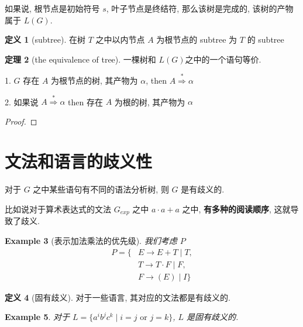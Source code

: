 \documentclass[12pt]{ctexart}
\theoremstyle{definition}
\theoremstyle{definition}
\newtheorem{definition}{定义}[section]
\newtheorem{thm}[definition]{定理}
\theoremstyle{plain}
\newtheorem{exam}[definition]{Example}
\theoremstyle{remark}
\begin{document}
如果说, 根节点是初始符号 \(s\), 叶子节点是终结符, 那么该树是完成的, 该树的产物属于 \(L (G) \). 
\begin{definition}[subtree]\label{def:subtree}
在树 \(T\) 之中以内节点 \(A\) 为根节点的 subtree 为 \(T\) 的 subtree
\end{definition}

\begin{thm}[the equivalence of tree]
	一棵树和 \(L (G)\)之中的一个语句等价. 

	1. \(G\) 存在 \(A\) 为根节点的树, 其产物为 \(\alpha\), then \(A \overset{*}{\Rightarrow}\alpha\)

	2. 如果说 \(A \overset{*}{\Rightarrow}\alpha\) then 存在 \(A\) 为根的树, 其产物为 \(\alpha\)
\end{thm}
\begin{proof}
\end{proof}


\section{文法和语言的歧义性}\label{sec:文法和语言的歧义性}

对于 \(G\) 之中某些语句有不同的语法分析树, 则 \(G\) 是有歧义的.

比如说对于算术表达式的文法 \(G_{exp}\) 之中 \(a \cdot a  +  a\) 之中, \textbf{有多种的阅读顺序}, 这就导致了歧义. 

\begin{exam}[表示加法乘法的优先级]
我们考虑 \(P\)
\begin{equation}
\begin{aligned}
	P  = \{  &E \to E + T \mid T ,\\ 
	  &T \to T \cdot F \mid F , \\
	  &F \to (E) \mid I \}
\end{aligned}
\end{equation}
\end{exam}

\begin{definition}[固有歧义]\label{def:固有歧义}
	对于一些语言, 其对应的文法都是有歧义的.
\end{definition}

\begin{exam}
	对于 \(L = \{ a ^{i }  b ^{j} c ^{k} \mid i =  j \text{ or } j = k \} \), \(L\) 是固有歧义的. 
\end{exam}
\end{document}
